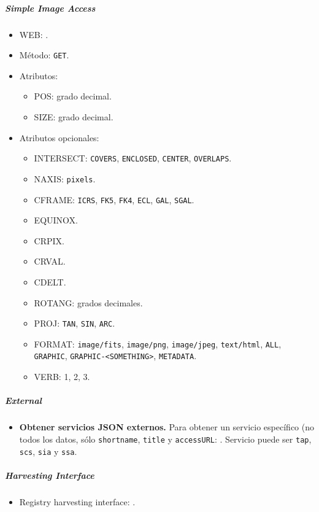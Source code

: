 \subparagraph{Simple Image Access}

\begin{itemize}
	\item WEB: \url{}.
	\item M\'etodo: \verb;GET;.
	\item Atributos: 
		\begin{itemize}
			\item POS: grado decimal.
			\item SIZE: grado decimal.
		\end{itemize}
	\item Atributos opcionales:
		\begin{itemize}
			\item INTERSECT: \verb;COVERS;, \verb;ENCLOSED;, \verb;CENTER;, \verb;OVERLAPS;.
			\item NAXIS: \verb;pixels;.
			\item CFRAME: \verb;ICRS;, \verb;FK5;, \verb;FK4;, \verb;ECL;, \verb;GAL;, \verb;SGAL;.
			\item EQUINOX.
			\item CRPIX.
			\item CRVAL.
			\item CDELT.
			\item ROTANG: grados decimales.
			\item PROJ: \verb;TAN;, \verb;SIN;, \verb;ARC;.
			\item FORMAT: \verb;image/fits;, \verb;image/png;, \verb;image/jpeg;, \verb;text/html;, \verb;ALL;, \verb;GRAPHIC;, \verb;GRAPHIC-<SOMETHING>;, \verb;METADATA;.
			\item VERB: 1, 2, 3.
		\end{itemize}
\end{itemize}

\subparagraph{External} 

\begin{itemize}
	\item {\bf Obtener servicios JSON externos.} Para obtener un servicio específico (no todos los datos, sólo \verb;shortname;, \verb;title; y \verb;accessURL;: \url{}. Servicio puede ser \verb;tap;, \verb;scs;, \verb;sia; y \verb;ssa;.
\end{itemize}

\subparagraph{\emph{Harvesting Interface}}

\begin{itemize}
	\item Registry harvesting interface: \url{}.
\end{itemize}
